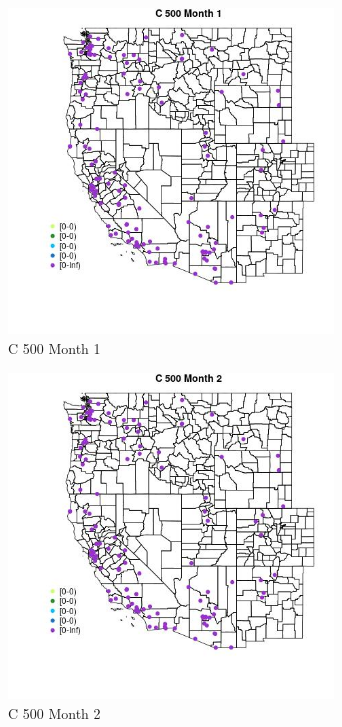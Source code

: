 \begin{figure} 
\centering  
\includegraphics[width=0.77\textwidth]{Code_Outputs/Report_ML_input_PM25_Step4_part_e_de_duplicated_aves_MapObsMo1C_500.jpg} 
\caption{\label{fig:Report_ML_input_PM25_Step4_part_e_de_duplicated_avesMapObsMo1C_500}C 500 Month 1} 
\end{figure} 
 

\begin{figure} 
\centering  
\includegraphics[width=0.77\textwidth]{Code_Outputs/Report_ML_input_PM25_Step4_part_e_de_duplicated_aves_MapObsMo2C_500.jpg} 
\caption{\label{fig:Report_ML_input_PM25_Step4_part_e_de_duplicated_avesMapObsMo2C_500}C 500 Month 2} 
\end{figure} 
 

